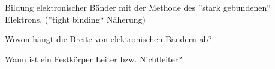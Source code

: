 \documentclass[a5paper,12pt,ngerman,print,grid=front]{kartei}
\begin{document}
	\begin{karte}{
		Bildung elektronischer Bänder mit der Methode des ”stark gebundenen“ Elektrons. 
		(”tight binding“ Näherung)
		}
		
		
		
	\end{karte}


	\begin{karte}{
		Wovon hängt die Breite von elektronischen Bändern ab?
		}
		
		
		
	\end{karte}


	\begin{karte}{
		Wann ist ein Festkörper Leiter bzw. Nichtleiter?
		}
		
		
		
	\end{karte}

\end{document}
